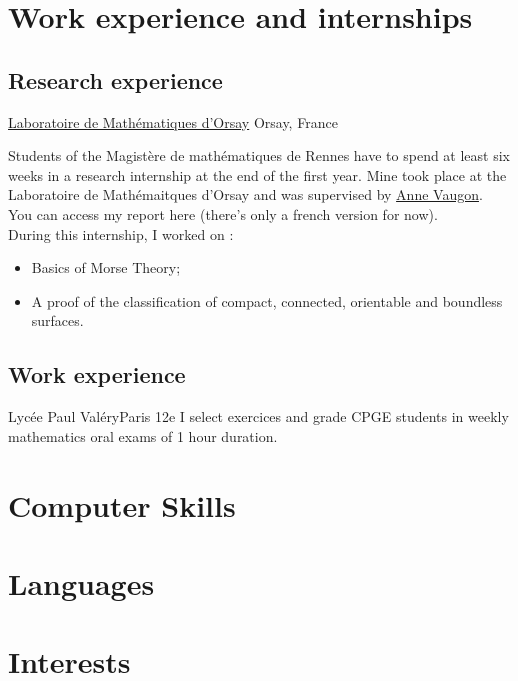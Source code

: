 \documentclass[11pt,letterpaper,sans]{moderncv}
\begin{document}
\section{Work experience and internships}

\subsection{Research experience}
{\href{https://www.imo.universite-paris-saclay.fr/fr/}{Laboratoire de Mathématiques d'Orsay}}
{Orsay, France}{}{
	Students of the Magistère de mathématiques de Rennes have to spend at least six weeks in 
	a research internship at the end of the first year. Mine took place at the Laboratoire de 
	Mathémaitques d'Orsay and was supervised by \href{https://anne.vaugon.vwx.fr/}{Anne Vaugon}.\\
	You can access my report \color{newred} here \color{black} (there's only a french version for now).\\
	During this internship, I worked on : 
	\begin{itemize}
		\item Basics of Morse Theory; 
		\item A proof of the classification of compact, connected, orientable and boundless
		surfaces.\\
		\vspace{1em} 
		\begin{center}
			
		\end{center}
	\end{itemize}
}

\subsection{Work experience}
{Lycée Paul Valéry}{Paris 12e}{}{
	I select exercices and grade CPGE students in weekly mathematics oral exams
	of 1 hour duration. 
}


\section{Computer Skills}

\section{Languages}

\section{Interests}
\end{document}
